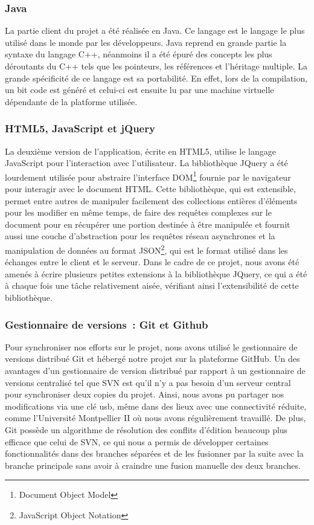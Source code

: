 \documentclass[a4paper,11pt,french]{article}
\begin{document}
\subsubsection{Java}
La partie client du projet a été réalisée en Java. Ce langage est le langage le plus utilisé dans le monde par les développeurs. Java reprend en grande partie la syntaxe du langage C++, néanmoins il a été épuré des concepts les plus déroutants du C++ tels que les pointeurs, les références et l'héritage multiple. La grande spécificité de ce langage est sa portabilité. En effet, lors de la compilation, un bit code est généré et celui-ci est ensuite lu par une machine virtuelle dépendante de la platforme utilisée.

\subsubsection{HTML5, JavaScript et jQuery}

La deuxième version de l'application, écrite en HTML5, utilise le langage JavaScript pour l'interaction avec l'utilisateur. La bibliothèque JQuery a été lourdement utilisée pour abstraire l'interface DOM\footnote{Document Object Model} fournie par le navigateur pour interagir avec le document HTML. Cette bibliothèque, qui est extensible, permet entre autres de manipuler facilement des collections entières d'éléments pour les modifier en même temps, de faire des requêtes complexes sur le document pour en récupérer une portion destinée à être manipulée et
fournit aussi une couche d'abstraction pour les requêtes réseau asynchrones et la manipulation de données au format JSON\footnote{JavaScript Object Notation}, qui est le format utilisé dans les échanges entre le client et le serveur. Dans le cadre de ce projet, nous avons été amenés à écrire plusieurs petites extensions à la bibliothèque JQuery, ce qui a été à chaque fois une tâche relativement aisée, vérifiant ainsi l'extensibilité de cette bibliothèque.

\subsubsection{Gestionnaire de versions~: Git et Github}

Pour synchroniser nos efforts sur le projet, nous avons utilisé le gestionnaire de versions distribué Git et hébergé notre projet sur la plateforme GitHub. Un des avantages d'un gestionnaire de version distribué par rapport à un gestionnaire de versions centralisé tel que SVN est qu'il n'y a pas besoin d'un serveur central pour synchroniser deux copies du projet. Ainsi, nous avons pu partager nos modifications via une clé usb, même dans des lieux avec une connectivité réduite, comme l'Université Montpellier II où nous avons régulièrement travaillé. 
De plus, Git possède un algorithme de résolution des conflits d'édition beaucoup plus efficace que celui de SVN, ce qui nous a permis de développer certaines fonctionnalités dans des branches séparées et de les fusionner par la suite avec la branche principale sans avoir à craindre une fusion manuelle des deux branches.
\end{document}
